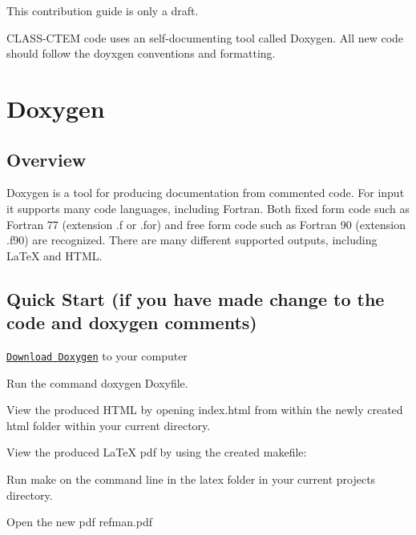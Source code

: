 This contribution guide is only a draft.

C\+L\+A\+S\+S-\/\+C\+T\+E\+M code uses an self-\/documenting tool called Doxygen. All new code should follow the doyxgen conventions and formatting.

\section*{Doxygen}

\subsection*{Overview}

Doxygen is a tool for producing documentation from commented code. For input it supports many code languages, including Fortran. Both fixed form code such as Fortran 77 (extension .f or .for) and free form code such as Fortran 90 (extension .f90) are recognized. There are many different supported outputs, including La\+Te\+X and H\+T\+M\+L.

\subsection*{Quick Start (if you have made change to the code and doxygen comments)}


\begin{DoxyEnumerate}
\item \href{http://www.stack.nl/~dimitri/doxygen/download.html}{\tt Download Doxygen} to your computer
\end{DoxyEnumerate}
\begin{DoxyEnumerate}
\item Run the command \textquotesingle{}doxygen Doxyfile\textquotesingle{}.
\end{DoxyEnumerate}
\begin{DoxyEnumerate}
\item View the produced H\+T\+M\+L by opening \textquotesingle{}index.\+html\textquotesingle{} from within the newly created \textquotesingle{}html\textquotesingle{} folder within your current directory.
\end{DoxyEnumerate}
\begin{DoxyEnumerate}
\item View the produced La\+Te\+X pdf by using the created makefile\+:
\begin{DoxyItemize}
\item Run \textquotesingle{}make\textquotesingle{} on the command line in the \textquotesingle{}latex\textquotesingle{} folder in your current project\textquotesingle{}s directory.
\item Open the new pdf \textquotesingle{}refman.\+pdf\textquotesingle{}
\end{DoxyItemize}
\end{DoxyEnumerate}

